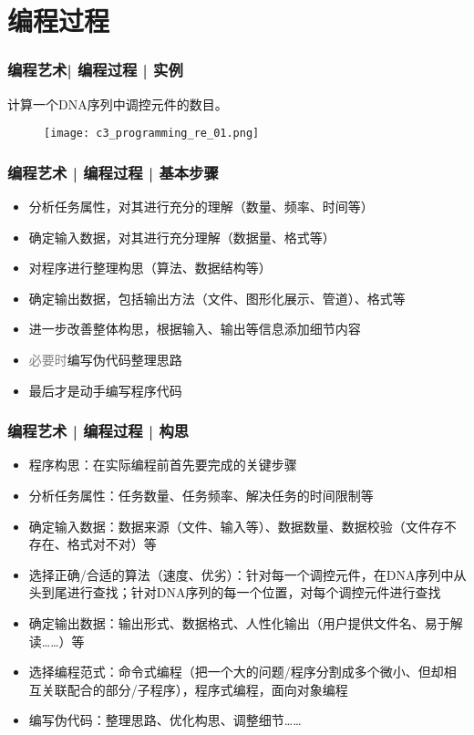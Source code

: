 \section{编程过程}
\begin{frame}
  \frametitle{编程艺术| 编程过程 | 实例}
  \begin{center}
    {\Large 计算一个DNA序列中调控元件的数目。}
  \end{center}
  \begin{figure}
    \centering
    \texttt{[image: c3\_programming\_re\_01.png]}
  \end{figure}
\end{frame}

\begin{frame}
  \frametitle{编程艺术 | 编程过程 | \alert{基本步骤}}
  \begin{itemize}
    \item 分析任务属性，对其进行充分的理解（数量、频率、时间等）
    \item 确定输入数据，对其进行充分理解（数据量、格式等）
    \item 对程序进行整理构思（算法、数据结构等）
    \item 确定输出数据，包括输出方法（文件、图形化展示、管道）、格式等
    \item 进一步改善整体构思，根据输入、输出等信息添加细节内容
    \item \textcolor{gray}{必要时}编写伪代码整理思路
    \item \alert{最后}才是动手编写程序代码
  \end{itemize}
\end{frame}

\begin{frame}
  \frametitle{编程艺术 | 编程过程 | \alert{构思}}
  \begin{itemize}
    \item 程序构思：在实际编程前首先要完成的关键步骤
    \item 分析任务属性：任务数量、任务频率、解决任务的时间限制等
    \item 确定输入数据：数据来源（文件、输入等）、数据数量、数据校验（文件存不存在、格式对不对）等
    \item 选择正确/合适的算法（速度、优劣）：针对每一个调控元件，在DNA序列中从头到尾进行查找；针对DNA序列的每一个位置，对每个调控元件进行查找
    \item 确定输出数据：输出形式、数据格式、人性化输出（用户提供文件名、易于解读……）等
    \item 选择编程范式：命令式编程（把一个大的问题/程序分割成多个微小、但却相互关联配合的部分/子程序），程序式编程，面向对象编程
    \item 编写伪代码：整理思路、优化构思、调整细节……
  \end{itemize}
\end{frame}

